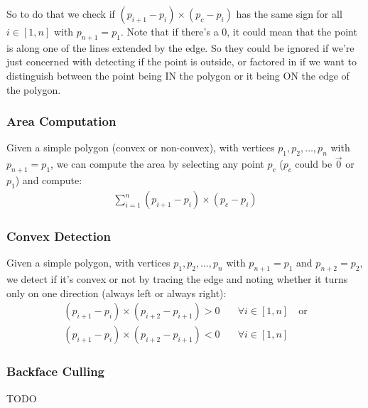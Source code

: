 \documentclass[12pt]{report}
\begin{document}
		So to do that we check if $(p_{i+1} - p_i) \times (p_c - p_i)$ has the same sign for all $i \in [1,n]$ with $p_{n + 1} = p_1$. Note that if there's a $0$, it could mean that the point is along one of the lines extended by the edge. So they could be ignored if we're just concerned with detecting if the point is outside, or factored in if we want to distinguish between the point being IN the polygon or it being ON the edge of the polygon.
		
		\subsubsection{Area Computation}
		Given a simple polygon (convex or non-convex), with vertices $p_1, p_2, \dots, p_n$ with $p_{n+1} = p_1$, we can compute the area by selecting any point $p_c$ ($p_c$ could be $\vec{0}$ or $p_1$) and compute:
		\begin{align}
		\sum_{i = 1}^{n} (p_{i + 1} - p_i) \times (p_c - p_i)
		\end{align}
		\subsubsection{Convex Detection}
		Given a simple polygon, with vertices $p_1, p_2, \dots, p_n$ with $p_{n+1} = p_1$ and $p_{n+2} = p_2$, we detect if it's convex or not by tracing the edge and noting whether it turns only on one direction (always left or always right):
		\begin{align*}
		(p_{i + 1} - p_i) \times (p_{i + 2} - p_{i + 1}) > 0 & \quad \forall i \in [1,n] \quad \text{or}\\
		(p_{i + 1} - p_i) \times (p_{i + 2} - p_{i + 1}) < 0 & \quad \forall i \in [1,n]
		\end{align*}
		\subsubsection{Backface Culling}
		TODO
\end{document}
